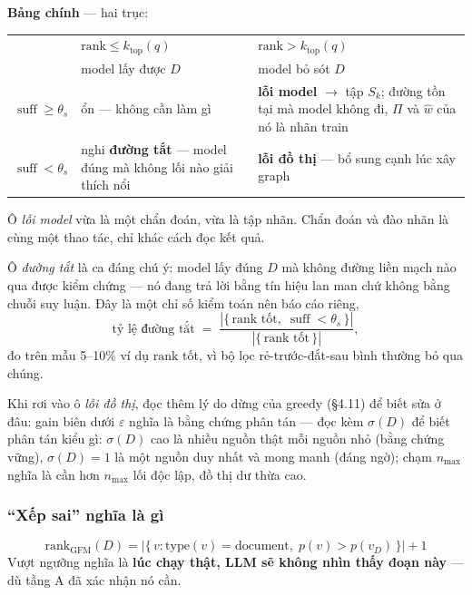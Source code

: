 \documentclass[11pt,a4paper]{article}
\DeclareMathOperator{\suff}{suff}
\begin{document}
\textbf{Bảng chính} --- hai trục:

\begin{center}
\begin{tabular}{@{}l>{\raggedright\arraybackslash}p{3.9cm}>{\raggedright\arraybackslash}p{5.2cm}@{}}
\toprule
 & $\mathrm{rank}\le k_{\text{top}}(q)$ & $\mathrm{rank}>k_{\text{top}}(q)$ \\
 & {\footnotesize model lấy được $D$} & {\footnotesize model bỏ sót $D$} \\
\midrule
$\suff\ge\theta_s$ & ổn --- không cần làm gì
   & \textbf{lỗi model} $\to$ tập $S_k$; đường tồn tại mà model không đi, $\Pi$ và
     $\widehat w$ của nó là nhãn train \\
\addlinespace
$\suff<\theta_s$ & nghi \textbf{đường tắt} --- model đúng mà không lối nào giải thích nổi
   & \textbf{lỗi đồ thị} --- bổ sung cạnh lúc xây graph \\
\bottomrule
\end{tabular}
\end{center}

Ô \emph{lỗi model} vừa là một chẩn đoán, vừa là tập nhãn. Chẩn đoán và đào nhãn là cùng một
thao tác, chỉ khác cách đọc kết quả.

Ô \emph{đường tắt} là ca đáng chú ý: model lấy đúng $D$ mà không đường liền mạch nào qua
được kiểm chứng --- nó đang trả lời bằng tín hiệu lan man chứ không bằng chuỗi suy luận. Đây
là một chỉ số kiểm toán nên báo cáo riêng,
\[ \text{tỷ lệ đường tắt}\;=\;
   \frac{|\{\,\mathrm{rank}\text{ tốt},\;\suff<\theta_s\,\}|}{|\{\,\mathrm{rank}\text{ tốt}\,\}|}, \]
đo trên mẫu 5--10\% ví dụ $\mathrm{rank}$ tốt, vì bộ lọc rẻ-trước-đắt-sau bình thường bỏ qua
chúng.

Khi rơi vào ô \emph{lỗi đồ thị}, đọc thêm lý do dừng của greedy (\S4.11) để biết sửa ở đâu:
gain biên dưới $\varepsilon$ nghĩa là bằng chứng phân tán --- đọc kèm $\sigma(D)$ để biết
phân tán kiểu gì: $\sigma(D)$ cao là nhiều nguồn thật mỗi nguồn nhỏ (bằng chứng vững),
$\sigma(D)=1$ là một nguồn duy nhất và mong manh (đáng ngờ);
chạm $n_{\max}$ nghĩa là cần hơn $n_{\max}$ lối độc lập, đồ thị dư thừa cao.

\subsubsection*{``Xếp sai'' nghĩa là gì}

\[ \mathrm{rank}_{\text{GFM}}(D)=\big|\{\,v:\mathrm{type}(v)=\text{document},\;
   p(v)>p(v_D)\,\}\big|+1 \]
Vượt ngưỡng nghĩa là \textbf{lúc chạy thật, LLM sẽ không nhìn thấy đoạn này} --- dù tầng A
đã xác nhận nó cần.
\end{document}
